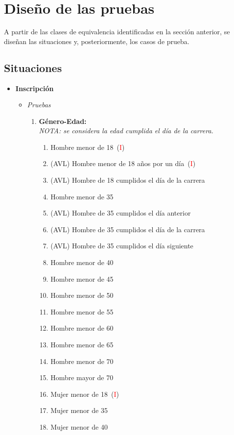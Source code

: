 \chapter{Diseño de las pruebas}
A partir de las clases de equivalencia identificadas en la sección anterior,
se diseñan las situaciones y, posteriormente, los casos de prueba.


\section{Situaciones}
\begin{itemize}
	\item \textbf{Inscripción}
		\begin{itemize}
			\item \textit{Pruebas}
				\begin{enumerate}[label*=SPI\arabic*.]
					\item \textbf{Género-Edad:}
						\\\textit{NOTA: se considera la edad cumplida el día de la carrera.}
						\begin{enumerate}[label*=\arabic*]
							\item Hombre menor de 18~(\textcolor{red}{I})
							\item (AVL) Hombre menor de 18 años por un día~(\textcolor{red}{I})
							\item (AVL) Hombre de 18 cumplidos el día de la carrera
							\item Hombre menor de 35
							\item (AVL) Hombre de 35 cumplidos el día anterior
							\item (AVL) Hombre de 35 cumplidos el día de la carrera
							\item (AVL) Hombre de 35 cumplidos el día siguiente
							\item Hombre menor de 40
							\item Hombre menor de 45
							\item Hombre menor de 50
							\item Hombre menor de 55
							\item Hombre menor de 60
							\item Hombre menor de 65
							\item Hombre menor de 70
							\item Hombre mayor de 70
							\item Mujer menor de 18~(\textcolor{red}{I})
							\item Mujer menor de 35
							\item Mujer menor de 40

\end{enumerate}
\end{enumerate}
\end{itemize}
\end{itemize}
